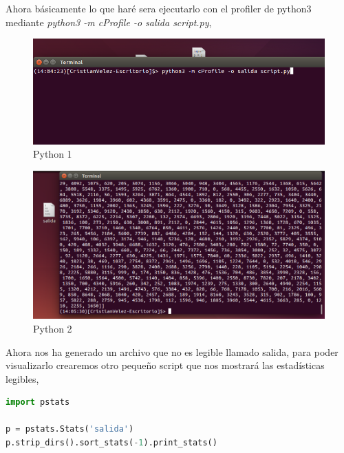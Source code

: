 Ahora básicamente lo que haré sera ejecutarlo con el profiler de python3 mediante \textit{python3 -m cProfile -o salida script.py},

\begin{figure}[H] %
	\centering
	\includegraphics[scale=0.35]{pics/python1.png}  %
	\caption{Python 1} \label{fig:python1}
\end{figure}

\begin{figure}[H] %
	\centering
	\includegraphics[scale=0.35]{pics/python2.png}  %
	\caption{Python 2} \label{fig:python2}
\end{figure}

Ahora nos ha generado un archivo que no es legible llamado salida, para poder visualizarlo crearemos otro pequeño script que nos mostrará las estadísticas legibles,


\begin{lstlisting}[language=python]
import pstats

p = pstats.Stats('salida')
p.strip_dirs().sort_stats(-1).print_stats()
\end{lstlisting}


